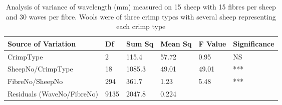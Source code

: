 %

\begin{table}[htp]
\centering
\caption{Analysis of variance of wavelength (mm) measured on 15 sheep with 15 fibres per sheep and 30 waves per fibre. Wools were of three crimp types with several sheep representing each crimp type}
\label{tab:sfwavlaov}
\vspace{0.1in}
\begin{tabular}{|p{1.4in}|p{0.4in}|p{0.4in}|p{0.4in}|p{0.4in}|p{0.8in}|} \hline
     Source of Variation & Df & Sum Sq  & Mean Sq  & F Value  & Significance  \\  \hline
 CrimpType & 2 & 115.4 & 57.72 & 0.95 & NS  \\
 SheepNo/CrimpType & 18 & 1085.3 & 49.01 &  49.01 & ***    \\ 
 FibreNo/SheepNo & 294 & 361.7 & 1.23 & 5.48 & ***  \\
 Residuals (WaveNo/FibreNo) & 9135 & 2047.8 & 0.224 & & \\ \hline
\end{tabular}
\end{table}

%
